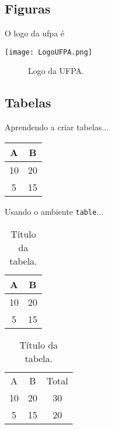 \documentclass{article}
\begin{document}
\subsection{Figuras}

O logo da ufpa é 

\texttt{[image: LogoUFPA.png]}

\newpage



\begin{figure}[t]
    \centering
    \caption{Logo da UFPA.}
    \label{fig:logo_ufpa}
\end{figure}

\subsection{Tabelas}

Aprendendo a criar tabelas...

\begin{tabular}{c|c} \hline
    A  & B \\ \hline
    10 & 20 \\
    5  & 15  \\ \hline 
\end{tabular}


Usando o ambiente \texttt{table}...

\begin{table}[h]
    \centering
    \caption{Título da tabela.}
    \vspace{0.3cm}
    \begin{tabular}{c|c} \hline
        A  & B \\ \hline
        10 & 20 \\
        5  & 15  \\ \hline 
    \end{tabular}
    \label{tab:tabela1}
\end{table}


\begin{table}[h]
    \centering
    \caption{Título da tabela.}
    \vspace{0.3cm}
    \begin{tabular}{ccc} \hline
        A  & B  & Total \\ \cline{1-2}
        10 & 20 &  30   \\
        5  & 15 &  20   \\ \hline 
    \end{tabular}
    \label{tab:tabela1}
\end{table}
\end{document}
